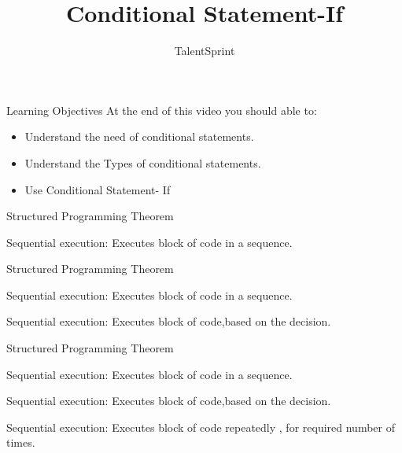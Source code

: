 \documentclass[aspectratio=169,14pt,usenames,dvipsnames]{beamer}
\title[Conditional Statement-If]{Conditional Statement-If}
\newcommand\tab[1][1cm]{\hspace*{#1}}
\begin{document}
{\1
\begin{frame} \vspace{35pt}

\subtitle{TalentSprint}
\maketitle
\end{frame}
}


\begin{frame}{Learning Objectives}
At the end of this video you should able to:
\begin{itemize}
\item Understand the need of conditional statements.
\item Understand the Types of conditional statements.
\item Use Conditional Statement- If
\end{itemize}
\end{frame}


\begin{frame}{Structured Programming Theorem}

\begin{block}{Sequential execution:}
\tab \tab Executes block of code in a sequence.
\end{block}
\end{frame}

\begin{frame}{Structured Programming Theorem}
\begin{block}{Sequential execution:}
\tab \tab Executes block of code in a sequence.
\begin{block}{Sequential execution:}
\tab \tab Executes block of code,based on the decision.
\end{block}
\end{block}
\end{frame}

\begin{frame}{Structured Programming Theorem}
\begin{block}{Sequential execution:}
\tab \tab Executes block of code in a sequence.
\begin{block}{Sequential execution:}
\tab \tab Executes block of code,based on the decision.
\begin{block}{Sequential execution:}
\tab \tab Executes block of code repeatedly , for required number \tab \tab of times.
\end{block}
\end{block}
\end{block}
\end{frame}
\end{document}
